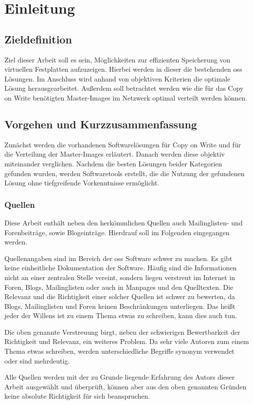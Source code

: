 \chapter{Einleitung}
\section{Zieldefinition}
Ziel dieser Arbeit soll es sein, Möglichkeiten zur effizienten Speicherung von virtuellen Festplatten aufzuzeigen. Hierbei werden in dieser die bestehenden \gls{oss} Lösungen. Im Anschluss wird anhand von objektiven Kriterien die optimale Lösung herausgearbeitet. Außerdem soll betrachtet werden wie die für das Copy on Write benötigten Master-Images im Netzwerk optimal verteilt werden können. 

\section{Vorgehen und Kurzzusammenfassung} 

Zunächst werden die vorhandenen Softwarelösungen für Copy on Write und für die Verteilung der Master-Images erläutert. Danach werden diese objektiv miteinander verglichen. Nachdem die besten Lösungen beider Kategorien gefunden wurden, werden Softwaretools erstellt, die die Nutzung der gefundenen Lösung ohne tiefgreifende Vorkenntnisse ermöglicht.

\subsection{Quellen}
Diese Arbeit enthält neben den herkömmlichen Quellen auch Mailinglisten- und Forenbeiträge, sowie Blogeinträge. Hierdrauf soll im Folgenden eingegangen werden.

Quellenangaben sind im Bereich der \gls{oss} Software schwer zu machen. Es gibt keine einheitliche Dokumentation der Software. Häufig sind die Informationen nicht an einer zentralen Stelle vereint, sondern liegen verstreut im Internet in Foren, Blogs, Mailinglisten oder auch in Manpages und den Quelltexten. Die Relevanz und die Richtigkeit einer solcher Quellen ist schwer zu bewerten, da Blogs, Mailinglisten und Foren keinen Beschränkungen unterliegen. Das heißt jeder der Willens ist zu einem Thema etwas zu schreiben, kann dies auch tun.

Die oben genannte Verstreuung birgt, neben der schwierigen Bewertbarkeit der Richtigkeit und Relevanz, ein weiteres Problem. Da sehr viele Autoren zum einem Thema etwas schreiben, werden unterschiedliche Begriffe synonym verwendet oder sind mehrdeutig.

Alle Quellen werden mit der zu Grunde liegende Erfahrung des Autors dieser Arbeit ausgewählt und überprüft, können aber aus den oben genannten Gründen keine absolute Richtigkeit für sich beanspruchen. 